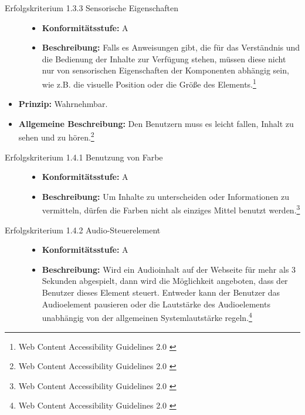 \begin{description}
\begin{description}
		\item[Erfolgskriterium 1.3.3 Sensorische Eigenschaften]\hfill
		\begin{itemize}
			\item \textbf{Konformitätsstufe:} A
			\item \textbf{Beschreibung:} Falls es Anweisungen gibt, die für das Verständnis und die Bedienung der Inhalte zur Verfügung stehen, müssen diese 
			nicht nur von sensorischen Eigenschaften der Komponenten abhängig sein, wie z.B. die visuelle Position oder die Größe des 
			Elements.\footnote{Web Content Accessibility Guidelines 2.0 \cite{WCAG2.0}}
		\end{itemize}
	\end{description}

	\item[Richtlinie 1.4 Unterscheidbar]\hfill
	\begin{itemize}
		\item \textbf{Prinzip:} Wahrnehmbar.
		\item \textbf{Allgemeine Beschreibung:} Den Benutzern muss es leicht fallen, Inhalt zu sehen und zu hören.\footnote{Web Content Accessibility Guidelines 2.0 \cite{WCAG2.0}}
	\end{itemize}
	
	\begin{description}
		\item[Erfolgskriterium 1.4.1 Benutzung von Farbe]\hfill
		\begin{itemize}
			\item \textbf{Konformitätsstufe:} A
			\item \textbf{Beschreibung:} Um Inhalte zu unterscheiden oder Informationen zu vermitteln, dürfen die Farben nicht als einziges Mittel benutzt 
			werden.\footnote{Web Content Accessibility Guidelines 2.0 \cite{WCAG2.0}}
		\end{itemize}
		
		\item[Erfolgskriterium 1.4.2 Audio-Steuerelement]\hfill
		\begin{itemize}
			\item \textbf{Konformitätsstufe:} A
			\item \textbf{Beschreibung:} Wird ein Audioinhalt auf der Webseite für mehr als 3 Sekunden abgespielt, dann wird die Möglichkeit angeboten, dass der 
			Benutzer dieses Element steuert. Entweder kann der Benutzer das Audioelement pausieren oder die Lautstärke des Audioelements unabhängig von der 
			allgemeinen Systemlautstärke regeln.\footnote{Web Content Accessibility Guidelines 2.0 \cite{WCAG2.0}}
		\end{itemize}
		

\end{description}
\end{description}
